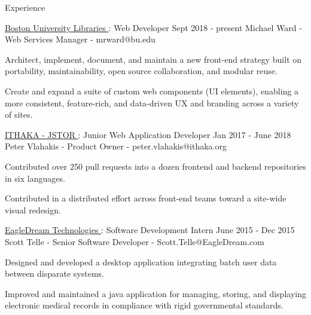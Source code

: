 \documentclass{resume} %
\begin{document}
  \begin{rSection}{Experience}

    \begin{rSubsection}{\underline{Boston University Libraries }: Web Developer }{ Sept 2018 - present }{ Michael Ward - Web Services Manager - mrward@bu.edu }

      \item Architect, implement, document, and maintain a new front-end strategy built on portability, maintainability, open source collaboration, and modular reuse.

      \item Create and expand a suite of custom web components (UI elements), enabling a more consistent, feature-rich, and data-driven UX and branding across a variety of sites.

    \end{rSubsection}

    \begin{rSubsection}{\underline{ITHAKA - JSTOR }: Junior Web Application Developer }{ Jan 2017 - June 2018 }{ Peter Vlahakis - Product Owner - peter.vlahakis@ithaka.org }

      \item Contributed over 250 pull requests into a dozen frontend and backend repositories in six languages.

      \item Contributed in a distributed effort across front-end teams toward a site-wide visual redesign.

    \end{rSubsection}

    \begin{rSubsection}{\underline{EagleDream Technologies }: Software Development Intern }{ June 2015 - Dec 2015 }{ Scott Telle - Senior Software Developer - Scott.Telle@EagleDream.com }

      \item Designed and developed a desktop application integrating batch user data between disparate systems.

      \item Improved and maintained a java application for managing, storing, and displaying electronic medical records in compliance with rigid governmental standards.

    \end{rSubsection}

  \end{rSection}
\end{document}
